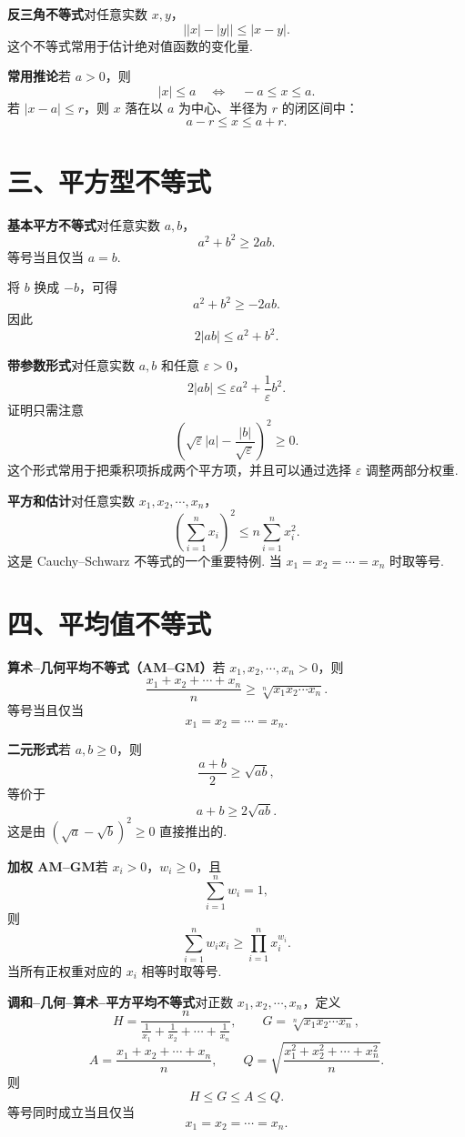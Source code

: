 \documentclass[UTF8, 12pt, fontset=fandol, oneside]{ctexart}
\begin{document}
\noindent\textbf{反三角不等式}\quad 对任意实数 $x,y$，
\[
  \bigl||x|-|y|\bigr|\le |x-y|.
\]
这个不等式常用于估计绝对值函数的变化量.

\noindent\textbf{常用推论}\quad 若 $a>0$，则
\[
  |x|\le a
  \quad\Longleftrightarrow\quad
  -a\le x\le a.
\]
若 $|x-a|\le r$，则 $x$ 落在以 $a$ 为中心、半径为 $r$ 的闭区间中：
\[
  a-r\le x\le a+r.
\]

\section*{三、平方型不等式}

\noindent\textbf{基本平方不等式}\quad 对任意实数 $a,b$，
\[
  a^2+b^2\ge2ab.
\]
等号当且仅当 $a=b$.

将 $b$ 换成 $-b$，可得
\[
  a^2+b^2\ge -2ab.
\]
因此
\[
  2|ab|\le a^2+b^2.
\]

\noindent\textbf{带参数形式}\quad 对任意实数 $a,b$ 和任意 $\varepsilon>0$，
\[
  2|ab|\le \varepsilon a^2+\frac{1}{\varepsilon}b^2.
\]
证明只需注意
\[
  \left(\sqrt{\varepsilon}|a|-\frac{|b|}{\sqrt{\varepsilon}}\right)^2\ge0.
\]
这个形式常用于把乘积项拆成两个平方项，并且可以通过选择 $\varepsilon$ 调整两部分权重.

\noindent\textbf{平方和估计}\quad 对任意实数 $x_1,x_2,\cdots,x_n$，
\[
  \left(\sum_{i=1}^n x_i\right)^2
  \le
  n\sum_{i=1}^n x_i^2.
\]
这是 Cauchy--Schwarz 不等式的一个重要特例. 当 $x_1=x_2=\cdots=x_n$ 时取等号.

\section*{四、平均值不等式}

\noindent\textbf{算术--几何平均不等式（AM--GM）}\quad 若 $x_1,x_2,\cdots,x_n>0$，则
\[
  \frac{x_1+x_2+\cdots+x_n}{n}
  \ge
  \sqrt[n]{x_1x_2\cdots x_n}.
\]
等号当且仅当
\[
  x_1=x_2=\cdots=x_n.
\]

\noindent\textbf{二元形式}\quad 若 $a,b\ge0$，则
\[
  \frac{a+b}{2}\ge\sqrt{ab},
\]
等价于
\[
  a+b\ge2\sqrt{ab}.
\]
这是由 $(\sqrt a-\sqrt b)^2\ge0$ 直接推出的.

\noindent\textbf{加权 AM--GM}\quad 若 $x_i>0$，$w_i\ge0$，且
\[
  \sum_{i=1}^n w_i=1,
\]
则
\[
  \sum_{i=1}^n w_i x_i
  \ge
  \prod_{i=1}^n x_i^{w_i}.
\]
当所有正权重对应的 $x_i$ 相等时取等号.

\noindent\textbf{调和--几何--算术--平方平均不等式}\quad 对正数 $x_1,x_2,\cdots,x_n$，定义
\[
  H=\frac{n}{\frac1{x_1}+\frac1{x_2}+\cdots+\frac1{x_n}},
  \qquad
  G=\sqrt[n]{x_1x_2\cdots x_n},
\]
\[
  A=\frac{x_1+x_2+\cdots+x_n}{n},
  \qquad
  Q=\sqrt{\frac{x_1^2+x_2^2+\cdots+x_n^2}{n}}.
\]
则
\[
  H\le G\le A\le Q.
\]
等号同时成立当且仅当
\[
  x_1=x_2=\cdots=x_n.
\]
\end{document}
